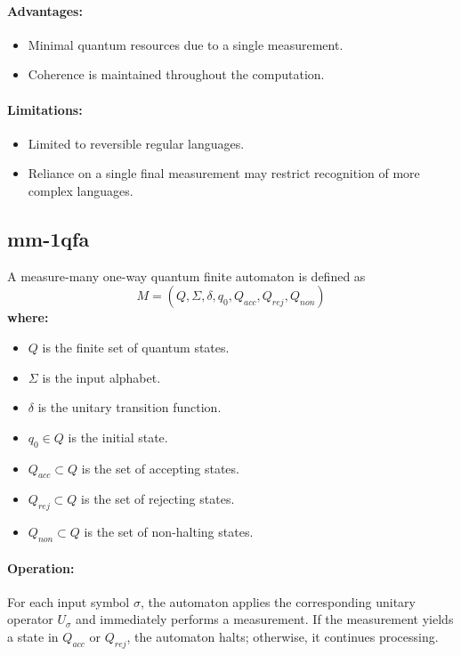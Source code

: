 \paragraph{Advantages:}
\begin{itemize}
    \item Minimal quantum resources due to a single measurement.
    \item Coherence is maintained throughout the computation.
\end{itemize}

\paragraph{Limitations:}
\begin{itemize}
    \item Limited to reversible regular languages.
    \item Reliance on a single final measurement may restrict recognition of more complex languages.
\end{itemize}

\subsection{\acrfull{mm-1qfa}}
\label{subsec:mm-1qfa}
\begin{definition}
A measure-many one-way quantum finite automaton is defined as 
\[
M = (Q, \Sigma, \delta, q_0, Q_{acc}, Q_{rej}, Q_{non})
\]
\textbf{where:}
\begin{itemize}
    \item \( Q \) is the finite set of quantum states.
    \item \( \Sigma \) is the input alphabet.
    \item \( \delta \) is the unitary transition function.
    \item \( q_0 \in Q \) is the initial state.
    \item \( Q_{acc} \subset Q \) is the set of accepting states.
    \item \( Q_{rej} \subset Q \) is the set of rejecting states.
    \item \( Q_{non} \subset Q \) is the set of non-halting states.
\end{itemize}
\end{definition}

\paragraph{Operation:}  
For each input symbol \( \sigma \), the automaton applies the corresponding unitary operator \( U_\sigma \) and immediately performs a measurement. If the measurement yields a state in \( Q_{acc} \) or \( Q_{rej} \), the automaton halts; otherwise, it continues processing.

